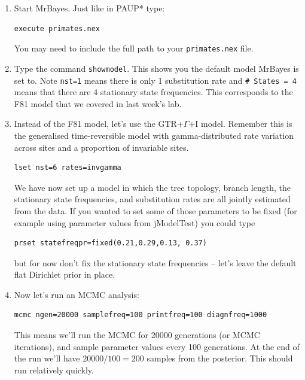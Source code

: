 \documentclass[11pt]{article}
\begin{document}
\begin{enumerate}

\item Start MrBayes. Just like in PAUP* type:

\begin{verbatim}
execute primates.nex
\end{verbatim}

You may need to include the full path to your \texttt{primates.nex} file.

\item Type the command \texttt{showmodel}. This shows you the default model
MrBayes is set to. Note \texttt{nst=1} means there is only 1 substitution rate
and \texttt{\# States  = 4} means that there are 4 stationary state frequencies.
This corresponds to the F81 model that we covered in last week's lab.

\item Instead of the F81 model, let's use the GTR+$\Gamma$+I model. 
Remember this is the generalised time-reversible model with 
gamma-distributed rate variation across sites and a proportion of invariable sites.

\begin{verbatim}
lset nst=6 rates=invgamma
\end{verbatim}

We have now set up a model in which the tree topology, branch length,
the stationary state frequencies, and substitution rates are all jointly estimated
from the data. 
If you wanted to set some of those parameters to be fixed
(for example using parameter values from jModelTest)
you could type

\begin{verbatim}
prset statefreqpr=fixed(0.21,0.29,0.13, 0.37)
\end{verbatim}

but for now don't fix the stationary state frequencies -- let's leave the default flat Dirichlet prior in place.

\item Now let's run an MCMC analysis:

\begin{verbatim}
mcmc ngen=20000 samplefreq=100 printfreq=100 diagnfreq=1000
\end{verbatim}

This means we'll run the MCMC for 20000 generations (or MCMC iterations),
and sample parameter values every 100 generations.
At the end of the run we'll have $20000/100=200$ samples from the posterior.
This should run relatively quickly.


\end{enumerate}
\end{document}
